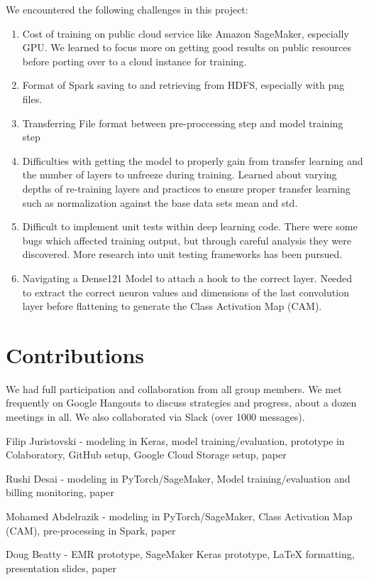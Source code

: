 \documentclass{amia}
\begin{document}
We encountered the following challenges in this project:
\begin{enumerate}
    \item Cost of training on public cloud service like Amazon SageMaker, especially GPU. We learned to focus more on getting good results on public resources before porting over to a cloud instance for training.
    \item Format of Spark saving to and retrieving from HDFS, especially with png files.
    \item Transferring File format between pre-proccessing step and model training step
    \item  Difficulties with getting the model to properly gain from transfer learning and the number of layers to unfreeze during training. Learned about varying depths of re-training layers and practices to ensure proper transfer learning such as normalization against the base data sets mean and std.
    \item  Difficult to implement unit tests within deep learning code. There were some bugs which affected training output, but through careful analysis they were discovered. More research into unit testing frameworks has been pursued.
    \item Navigating a Dense121 Model to attach a hook to the correct layer. Needed to extract the correct neuron values and dimensions of the last convolution layer before flattening to generate the Class Activation Map (CAM).
\end{enumerate}

\section*{Contributions}
We had full participation and collaboration from all group members. We met frequently on Google Hangouts to discuss strategies and progress, about a dozen meetings in all. We also collaborated via Slack (over 1000 messages).

Filip Juristovski - modeling in Keras, model training/evaluation, prototype in Colaboratory, GitHub setup, Google Cloud Storage setup, paper

Rushi Desai - modeling in PyTorch/SageMaker, Model training/evaluation and billing monitoring, paper

Mohamed Abdelrazik - modeling in PyTorch/SageMaker, Class Activation Map (CAM), pre-processing in Spark, paper

Doug Beatty - EMR prototype, SageMaker Keras prototype, LaTeX formatting, presentation slides, paper
\makeatletter
\end{document}
